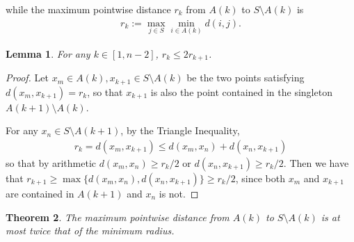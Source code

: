 \documentclass[a4paper,12pt]{article}
\newtheorem{thm}{Theorem}[subsection]
\newtheorem{lem}[thm]{Lemma}
\theoremstyle{remark}
\begin{document}
while the maximum pointwise distance $r_{k}$ from $A(k)$ to $S \setminus A(k)$ is
\begin{align*}
    r_k := \max_{j \in S} \min_{i \in A(k)} d(i, j).
\end{align*}
\begin{lem} \label{lem:approx-factor}
    For any $k \in [1, n - 2]$, $r_k \leq 2r_{k + 1}$.
\end{lem}
\begin{proof}
    Let $x_m \in A(k), x_{k + 1} \in S \setminus A(k)$ be the two points satisfying $d(x_m, x_{k + 1}) = r_k$, so that $x_{k + 1}$ is also the point contained in the singleton $A(k + 1) \setminus A(k)$. \par
    For any $x_n \in S \setminus A(k + 1)$, by the Triangle Inequality,
    \begin{align*}
        r_k = d(x_m, x_{k + 1}) \leq d(x_m, x_n) + d(x_n, x_{k + 1})
    \end{align*}
    so that by arithmetic $d(x_m, x_n) \geq r_k/2$ or $d(x_n, x_{k + 1}) \geq r_k/2$. Then we have that $r_{k + 1} \geq \max\{ d(x_m, x_n), d(x_n, x_{k + 1}) \} \geq r_k/2$, since both $x_m$ and $x_{k + 1}$ are contained in $A(k + 1)$ and $x_n$ is not. %
\end{proof}
\begin{thm}
    The maximum pointwise distance from $A(k)$ to $S \setminus A(k)$ is at most twice that of the minimum radius.
\end{thm}
\end{document}
